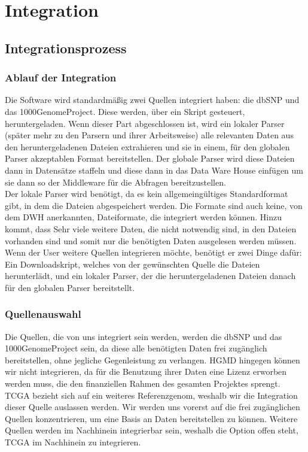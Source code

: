 \section{Integration}
\subsection{Integrationsprozess}
\subsubsection{Ablauf der Integration}
Die Software wird standardmäßig zwei Quellen integriert haben: die dbSNP und das 1000GenomeProject. Diese werden, über ein Skript gesteuert, heruntergeladen. Wenn dieser Part abgeschlossen ist, wird ein lokaler Parser (später mehr zu den Parsern und ihrer Arbeitsweise) alle relevanten Daten aus den heruntergeladenen Dateien extrahieren und sie in einem, für den globalen Parser akzeptablen Format bereitstellen. Der globale Parser wird diese Dateien dann in Datensätze staffeln und diese dann in das Data Ware House einfügen um sie dann so der Middleware für die Abfragen bereitzustellen.\\
Der lokale Parser wird benötigt, da es kein allgemeingültiges Standardformat gibt, in dem die Dateien abgespeichert werden. Die Formate sind auch keine, von dem DWH anerkannten, Dateiformate, die integriert werden können. Hinzu kommt, dass Sehr viele weitere Daten, die nicht notwendig sind, in den Dateien vorhanden sind und somit nur die benötigten Daten ausgelesen werden müssen.\\
Wenn der User weitere Quellen integrieren möchte, benötigt er zwei Dinge dafür: Ein Downloadskript, welches von der gewünschten Quelle die Dateien herunterlädt, und ein lokaler Parser, der die heruntergeladenen Dateien danach für den globalen Parser bereitstellt.
\subsubsection{Quellenauswahl}
Die Quellen, die von uns integriert sein werden, werden die dbSNP und das 1000GenomeProject sein, da diese alle benötigten Daten frei zugänglich bereitstellen, ohne jegliche Gegenleistung zu verlangen. HGMD hingegen können wir nicht integrieren, da für die Benutzung ihrer Daten eine Lizenz erworben werden muss, die den finanziellen Rahmen des gesamten Projektes sprengt. TCGA bezieht sich auf ein weiteres Referenzgenom, weshalb wir die Integration dieser Quelle auslassen werden. Wir werden uns vorerst auf die frei zugänglichen Quellen konzentrieren, um eine Basis an Daten bereitstellen zu können. Weitere Quellen werden im Nachhinein integrierbar sein, weshalb die Option offen steht, TCGA im Nachhinein zu integrieren.
